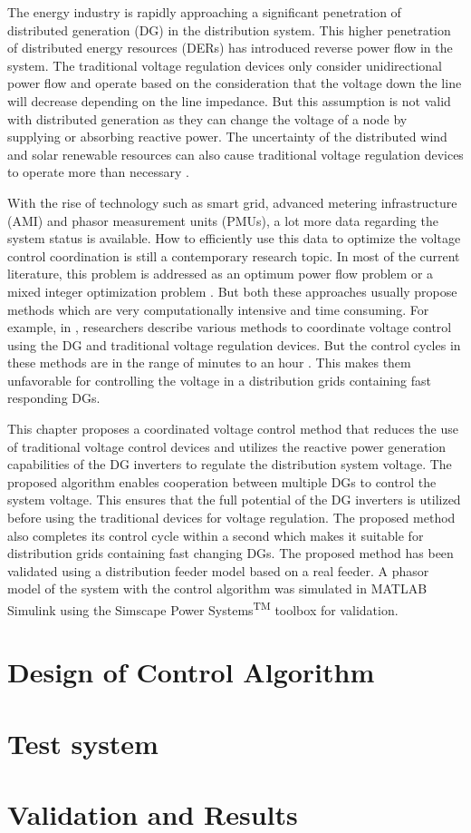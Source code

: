 The energy industry is rapidly approaching a significant penetration of distributed generation (DG) in the distribution system. This higher penetration of distributed energy resources (DERs) has introduced reverse power flow in the system. The traditional voltage regulation devices only consider unidirectional power flow and operate based on the consideration that the voltage down the line will decrease depending on the line impedance. But this assumption is not valid with distributed generation as they can change the voltage of a node by supplying or absorbing reactive power. The uncertainty of the distributed wind and solar renewable resources can also cause traditional voltage regulation devices to operate more than necessary \cite{int1}.

With the rise of technology such as smart grid, advanced metering infrastructure (AMI) and phasor measurement units (PMUs), a lot more data regarding the system status is available. How to efficiently use this data to optimize the voltage control coordination is still a contemporary research topic. In most of the current literature, this problem is addressed as an optimum power flow problem or a mixed integer optimization problem \cite{int2}. But both these approaches usually propose methods which are very computationally intensive and time consuming. For example, in \cite{LR5,LR1,LR2,LR3}, researchers describe various methods to coordinate voltage control using the DG and traditional voltage regulation devices. But the control cycles in these methods are in the range of minutes to an hour \cite{LR4}. This makes them unfavorable for controlling the voltage in a distribution grids containing fast responding DGs.

This chapter proposes a coordinated voltage control method that reduces the use of traditional voltage control devices and utilizes the reactive power generation capabilities of the DG inverters to regulate the distribution system voltage. The proposed algorithm enables cooperation between multiple DGs to control the system voltage. This ensures that the full potential of the DG inverters is utilized before using the traditional devices for voltage regulation. The proposed method also completes its control cycle within a second which makes it suitable for distribution grids containing fast changing DGs. The proposed method has been validated using a distribution feeder model based on a real feeder. A phasor model of the system with the control algorithm was simulated in MATLAB\textsuperscript{\textregistered} Simulink\textsuperscript{\textregistered} using the Simscape Power Systems\textsuperscript{TM} toolbox for validation.


\section{Design of Control Algorithm}\label{sec:design}


\section{Test system}


\section{Validation and Results}\label{sec:val}
